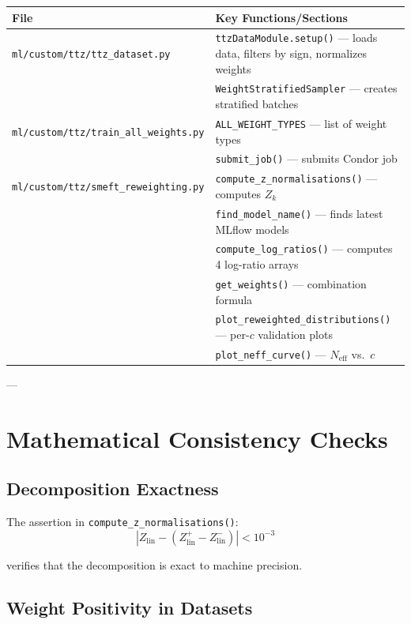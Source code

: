 \documentclass[11pt,a4paper]{article}
\begin{document}
\begin{table}[h!]
\centering
\small
\begin{tabular}{lp{10cm}}
\toprule
\textbf{File} & \textbf{Key Functions/Sections} \\
\midrule
\texttt{ml/custom/ttz/ttz\_dataset.py} & \texttt{ttzDataModule.setup()} — loads data, filters by sign, 
normalizes weights \\
& \texttt{WeightStratifiedSampler} — creates stratified batches \\
\midrule
\texttt{ml/custom/ttz/train\_all\_weights.py} & \texttt{ALL\_WEIGHT\_TYPES} — list of weight types \\
& \texttt{submit\_job()} — submits Condor job \\
\midrule
\texttt{ml/custom/ttz/smeft\_reweighting.py} & \texttt{compute\_z\_normalisations()} — computes $Z_k$ \\
& \texttt{find\_model\_name()} — finds latest MLflow models \\
& \texttt{compute\_log\_ratios()} — computes 4 log-ratio arrays \\
& \texttt{get\_weights()} — combination formula \\
& \texttt{plot\_reweighted\_distributions()} — per-$c$ validation plots \\
& \texttt{plot\_neff\_curve()} — $N_{\text{eff}}$ vs.\ $c$ \\
\bottomrule
\end{tabular}
\end{table}

---

\section{Mathematical Consistency Checks}

\subsection{Decomposition Exactness}

The assertion in \texttt{compute\_z\_normalisations()}:
\begin{equation}
\left| Z_{\text{lin}} - (Z_{\text{lin}}^+ - Z_{\text{lin}}^-) \right| < 10^{-3}
\end{equation}

verifies that the decomposition is exact to machine precision.

\subsection{Weight Positivity in Datasets}
\end{document}
